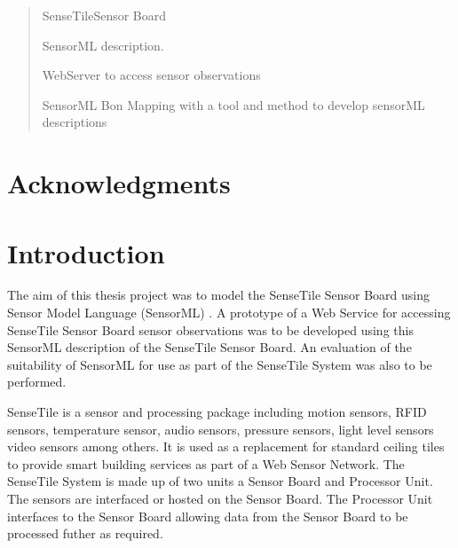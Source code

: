 \documentclass[]{final_report}
\begin{document}
\maketitle
\tableofcontents{}\newpage


\begin{abstract}
SenseTileSensor Board

SensorML description.

WebServer to access sensor observations

SensorML Bon Mapping with a tool and method to develop sensorML descriptions

\end{abstract}




\newpage



\chapter*{Acknowledgments}



\chapter{Introduction}

The aim of this thesis project was to model the SenseTile Sensor Board using Sensor Model Language (SensorML)\cite{SensoMLref} . A prototype of a Web Service for accessing SenseTile Sensor Board sensor observations was to be developed using this SensorML description of the SenseTile Sensor Board. An evaluation of the suitability of SensorML for use as part of the SenseTile System was also to be performed.

SenseTile is a sensor and processing package including motion sensors, RFID sensors, temperature sensor, audio sensors, pressure sensors, light level sensors video sensors among others. It is used as a replacement for standard ceiling tiles to provide smart building services as part of a Web Sensor Network. The SenseTile System is made up of two units a Sensor Board and Processor Unit. The sensors are interfaced or hosted on the Sensor Board. The Processor Unit interfaces to the Sensor Board allowing data from the Sensor Board to be processed futher as required.
\end{document}

